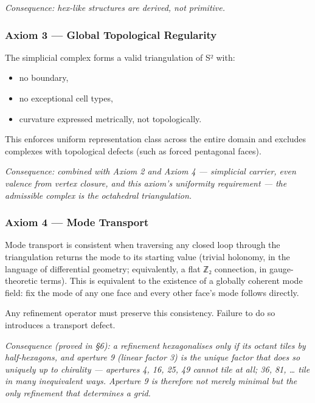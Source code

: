 \documentclass[
  11pt,
  a4paper,
]{article}
\providecommand{\tightlist}{%
  \setlength{\itemsep}{0pt}\setlength{\parskip}{0pt}}
\begin{document}
\emph{Consequence: hex-like structures are derived, not primitive.}

\subsubsection{Axiom 3 --- Global Topological
Regularity}\label{axiom-3-global-topological-regularity}

The simplicial complex forms a valid triangulation of S² with:

\begin{itemize}
\tightlist
\item
  no boundary,
\item
  no exceptional cell types,
\item
  curvature expressed metrically, not topologically.
\end{itemize}

This enforces uniform representation class across the entire domain and
excludes complexes with topological defects (such as forced pentagonal
faces).

\emph{Consequence: combined with Axiom 2 and Axiom 4 --- simplicial
carrier, even valence from vertex closure, and this axiom's uniformity
requirement --- the admissible complex is the octahedral triangulation.}

\subsubsection{Axiom 4 --- Mode Transport}\label{axiom-4-mode-transport}

Mode transport is consistent when traversing any closed loop through the
triangulation returns the mode to its starting value (trivial holonomy,
in the language of differential geometry; equivalently, a flat ℤ₂
connection, in gauge-theoretic terms). This is equivalent to the
existence of a globally coherent mode field: fix the mode of any one
face and every other face's mode follows directly.

Any refinement operator must preserve this consistency. Failure to do so
introduces a transport defect.

\emph{Consequence (proved in §6): a refinement hexagonalises only if its
octant tiles by half-hexagons, and aperture 9 (linear factor 3) is the
unique factor that does so uniquely up to chirality --- apertures 4, 16,
25, 49 cannot tile at all; 36, 81, \ldots{} tile in many inequivalent
ways. Aperture 9 is therefore not merely minimal but the only refinement
that determines a grid.}
\end{document}
